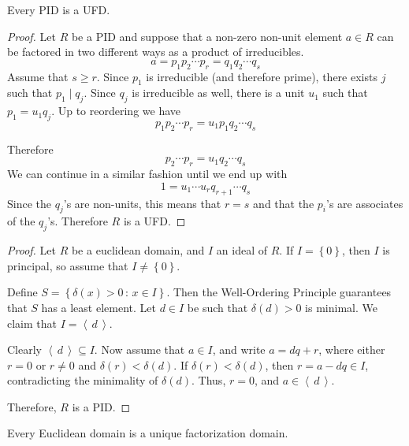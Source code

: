 \documentclass[english,course]{lecture}
\renewcommand{\geq}{\geqslant}
\newcommand{\ideal}[1]{\left\langle\, #1 \,\right\rangle}
\newenvironment{hint}{\startimportant}{}
\def\startimportant#1\end{[{Hint:} #1]\end}
\theoremstyle{plain}
\def\set#1{\left\{ {#1} \right\}}
\def\setof#1#2{{\left\{#1\,\colon\,#2\right\}}}
\def\presnotes{}
\begin{document}
\presnotes

\begin{theorem}\label{thm:pidisufd}
	Every PID is a UFD.
\end{theorem}

\begin{proof}
	Let $R$ be a PID and suppose that a non-zero non-unit element $a\in R$ can be factored in two different ways as a product of irreducibles.
	\[a=p_1p_2\cdots p_r=q_1q_2\cdots q_s\] 
	Assume that $s\geq r$. Since $p_1$ is irreducible (and therefore prime), there exists $j$ such that $p_1 \mid q_j$. Since $q_j$ is irreducible as well, there is a unit $u_1$ such that $p_1=u_1 q_j$. Up to reordering we have
	\[p_1p_2\cdots p_r=u_1p_1q_2\cdots q_s\]
	
	Therefore \[p_2\cdots p_r=u_1q_2\cdots q_s\]
	We can continue in a similar fashion until we end up with
	\[1=u_1\cdots u_rq_{r+1}\cdots q_s\]
	Since the $q_j$'s are non-units, this means that $r=s$ and that the $p_i$'s are associates of the $q_j$'s. Therefore $R$ is a UFD.
\end{proof}

\presnotes


\begin{proof}
	Let $R$ be a euclidean domain, and $I$ an ideal of $R$.
	If $I = \set{0}$, then $I$ is principal, so assume that $I\ne \set{0}$.
	
	Define $S = \setof{\delta(x)>0}{x\in I}$.
	Then the Well-Ordering Principle guarantees that $S$ has a least element.
	Let $d\in I$ be such that $\delta(d) > 0$ is minimal.
	We claim that $I = \ideal{d}$.
	
	Clearly $\ideal{d}\subseteq I$.
	Now assume that $a\in I$, and write $a = dq + r$, where either $r = 0$ or $r\ne 0$ and $\delta(r) < \delta(d)$.
	If $\delta(r) < \delta(d)$, then $r = a - dq \in I$, contradicting the minimality of $\delta(d)$.
	Thus, $r = 0$, and $a\in \ideal{d}$.
	
	Therefore, $R$ is a PID.
\end{proof}

\presnotes


\begin{theorem}\label{theorem:everyedisufd}
	Every Euclidean domain is a unique factorization domain.
\end{theorem}
\end{document}
